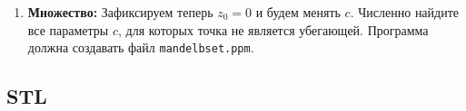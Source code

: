\documentclass{article}
\begin{document}
\begin{enumerate}
\item \textbf{Множество:} Зафиксируем теперь $z_0 = 0$ и будем менять $c$. Численно найдите все параметры $c$, для которых точка не является убегающей. Программа должна создавать файл \texttt{mandelbset.ppm}.
\end{enumerate}


\subsection*{STL}
\end{document}
